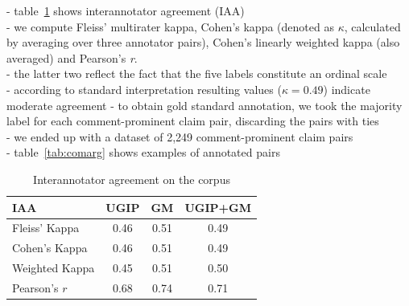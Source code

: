\noindent - table~\ref{tab:iaa} shows interannotator agreement (IAA) \\ 
- we compute Fleiss' multirater kappa, Cohen's kappa (denoted as $\kappa$, calculated by
averaging over three annotator pairs), Cohen's linearly weighted kappa (also
averaged) and Pearson's \textit{r}. \\ 
- the latter two reflect the fact that
the five labels constitute an ordinal scale \\ 
- according to standard interpretation \citep{landis1977measurement} resulting
values ($\kappa = 0.49$) indicate moderate agreement 
- to obtain gold standard annotation, we took the majority label for 
each comment-prominent claim pair, discarding the pairs with ties \\
- we ended up with a dataset of 2,249 comment-prominent claim pairs \\
- table~\ref{tab:comarg} shows examples of annotated pairs \\

\begin{table}
\centering
{\small
\begin{tabular}{l ccc}
\toprule
IAA & UGIP & GM & UGIP+GM \\
\midrule
Fleiss' Kappa    & 0.46 & 0.51 & 0.49 \\
Cohen's Kappa    & 0.46 & 0.51 & 0.49 \\
Weighted Kappa   & 0.45 & 0.51 &  0.50\\
Pearson's $r$    & 0.68 & 0.74 &  0.71 \\
\bottomrule
\end{tabular}}
\caption{Interannotator agreement on the \ComArg corpus}
\label{tab:iaa}
\end{table}


